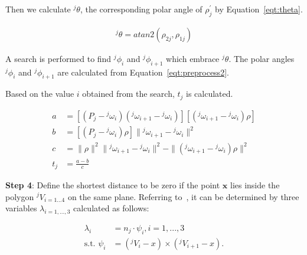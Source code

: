 Then we calculate ${^j\theta}$, the corresponding polar angle of $\rho^{\prime}_j$ by Equation~\ref{eqt:theta}.

\begin{equation}
\begin{aligned}
{^j\theta} = atan2 \left ( \rho_{2j},\rho_{1j} \right )
\end{aligned}
\label{eqt:theta}
\end{equation}

A search is performed to find ${^j\phi_i}$ and ${^j\phi_{i+1}}$ which embrace ${^j\theta}$.
The polar angles $^j\phi_i$ and ${^j\phi_{i+1}}$ are calculated from Equation~\ref{eqt:preprocess2}.


Based on the value $i$ obtained from the search, $t_j$ is calculated.

\begin{equation}
\begin{aligned}
a &= [(P_j-{^j\omega}_i)({^j\omega}_{i+1}-{^j\omega}_i)][({^j\omega}_{i+1}-{^j\omega}_i)\rho] \\
b &= [(P_j-{^j\omega}_i)\rho]\|{^j\omega}_{i+1}-{^j\omega}_i\|^2 \\
c &= \|\rho\|^2\|{^j\omega}_{i+1}-{^j\omega}_i\|^2-\|({^j\omega}_{i+1}-{^j\omega}_i)\rho\|^2 \\
t_j &= \frac{a-b}{c}
\end{aligned}
\label{eqt:t}
\end{equation}

\noindent \textbf{Step 4}:
Define the shortest distance to be zero if the point $\boldsymbol{x}$ lies inside the polygon $^jV_{i=1...4}$ on the same plane.
Referring to~\cite{preparata85}, it can be determined by three variables $\lambda_{i=1,...,3}$ calculated as follows:

\begin{equation}
\begin{aligned}
\lambda_i &= n_j \cdot \psi_i, i={1,...,3} \\
\mbox{s.t. } \psi_i &= (^jV_i-x) \times (^jV_{i+1}-x).
\end{aligned}
\label{eqt:lamda}
\end{equation}

